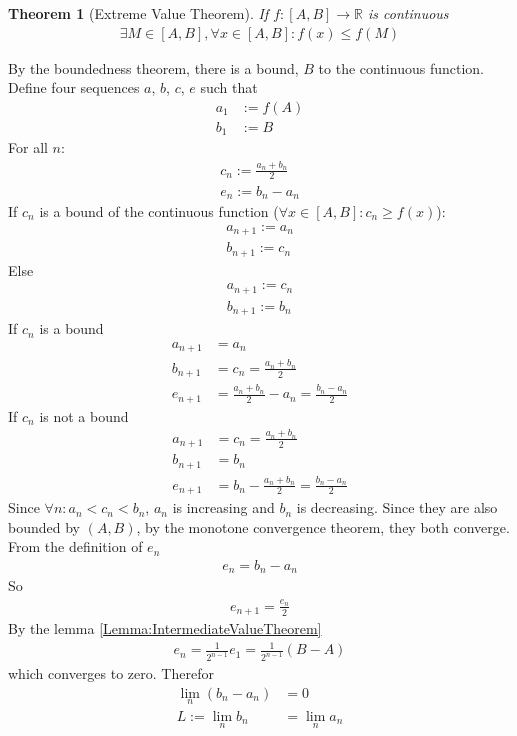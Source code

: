 \documentclass{amsart}
\numberwithin{equation}{section}
\let\oldendproof\endproof
\renewenvironment{proof}[1][\proofname]{%
  \setcounter{case}{0}
  \setcounter{step}{0}
  \oldproof[#1]%
}{\oldendproof}
\theoremstyle{plain}
\newtheorem{theorem}{Theorem}[section]
\theoremstyle{definition}
\theoremstyle{remark}
\begin{document}
\begin{theorem}[Extreme Value Theorem]
  If $f:[A,B]\to \mathbb{R}$ is continuous
  \begin{align}
    \exists M\in[A,B], \forall x\in[A,B]: f(x)\leq f(M)
  \end{align}
\end{theorem}
\begin{proof}
  By the boundedness theorem, there is a bound, $B$ to the continuous function. Define four sequences $a$, $b$, $c$, $e$ such that
  \begin{align}
    a_1&:= f(A)\\
    b_1&:=B
  \end{align}
  For all $n$:
  \begin{align}
    c_n:= \frac{a_n+b_n}{2}\\
    e_n := b_n - a_n
  \end{align}
  If $c_n$ is a bound of the continuous function ($\forall x\in[A,B]: c_n\geq f(x)$):
  \begin{align}
    a_{n+1} := a_n\\
    b_{n+1} := c_n
  \end{align}
  Else
  \begin{align}
    a_{n+1} := c_n\\
    b_{n+1} := b_n
  \end{align}
  If $c_n$ is a bound
  \begin{align}
    a_{n+1} &= a_n\\
    b_{n+1} &= c_n = \frac{a_n+b_n}{2}\\
    e_{n+1} &= \frac{a_n+b_n}{2} - a_n= \frac{b_n- a_n}{2}
  \end{align}
  If $c_n$ is not a bound
  \begin{align}
    a_{n+1} &= c_n = \frac{a_n+b_n}{2} \\
    b_{n+1} &= b_n\\
    e_{n+1} &= b_n - \frac{a_n + b_n}{2} = \frac{b_n - a_n}{2}
  \end{align}
  Since $\forall n:a_n<c_n<b_n$, $a_n$ is increasing and $b_n$ is decreasing. Since they are also bounded by $(A,B)$, by the monotone convergence theorem, they both converge.
  From the definition of $e_n$
  \begin{align}
    e_n = b_n- a_n
  \end{align}
  So
  \begin{align}
    e_{n+1} = \frac{e_n}{2}
  \end{align}
  By the lemma \ref{Lemma:IntermediateValueTheorem}
  \begin{align}
    e_n = \frac{1}{2^{n-1}} e_1 = \frac{1}{2^{n-1}} \left(B-A\right)		
  \end{align}
  which converges to zero. Therefor
  \begin{align}
    \lim_n (b_n - a_n) &= 0\\
    L:=\lim_n b_n &= \lim_n a_n
  \end{align}
\end{proof}
\end{document}
